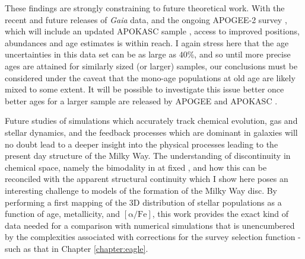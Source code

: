  These findings are strongly constraining to future theoretical work. With the recent \citep{2016arXiv160904303L} and future releases of \emph{Gaia} data, and the ongoing APOGEE-2 survey \citep{2014AAS...22344006S}, which will include an updated APOKASC sample \citep{2014ApJS..215...19P}, access to improved positions, abundances and age estimates is within reach. I again stress here that the age uncertainties in this data set can be as large as $40\%$, and so until more precise ages are attained for similarly sized (or larger) samples, our conclusions must be considered under the caveat that the mono-age populations at old age are likely mixed to some extent. It will be possible to investigate this issue better once better ages for a larger sample are released by APOGEE and APOKASC \citep{2014ApJS..215...19P}.

Future studies of simulations which accurately track chemical evolution, gas and stellar dynamics, and the feedback processes which are dominant in galaxies will no doubt lead to a deeper insight into the physical processes leading to the present day structure of the Milky Way. The understanding of discontinuity in chemical space, namely the bimodality in \afe{} at fixed \feh{}, and how this can be reconciled with the apparent structural continuity which I show here poses an interesting challenge to models of the formation of the Milky Way disc. By performing a first mapping of the 3D distribution of stellar populations as a function of age, metallicity, and $\mathrm{[\alpha/Fe]}$, this work provides the exact kind of data needed for a comparison with numerical simulations that is unencumbered by the complexities associated with corrections for the survey selection function - such as that in Chapter \ref{chapter:eagle}.





